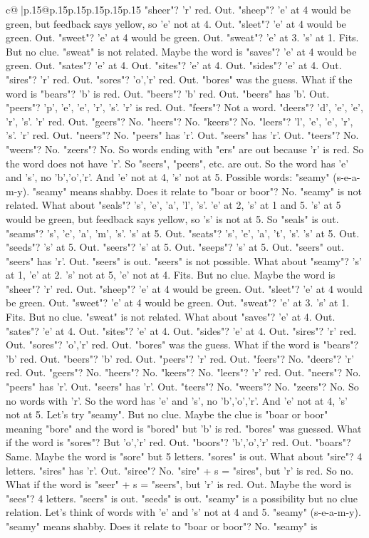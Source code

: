 \documentclass{article}
\begin{document}
{\begin{supertabular}{c@{$\;$}|p{.15\linewidth}@{}p{.15\linewidth}p{.15\linewidth}p{.15\linewidth}p{.15\linewidth}p{.15\linewidth}}
{{{"sheer"? 'r' red. Out. "sheep"? 'e' at 4 would be green, but feedback says yellow, so 'e' not at 4. Out. "sleet"? 'e' at 4 would be green. Out. "sweet"? 'e' at 4 would be green. Out. "sweat"? 'e' at 3. 's' at 1. Fits. But no clue. "sweat" is not related. Maybe the word is "saves"? 'e' at 4 would be green. Out. "sates"? 'e' at 4. Out. "sites"? 'e' at 4. Out. "sides"? 'e' at 4. Out. "sires"? 'r' red. Out. "sores"? 'o','r' red. Out. "bores" was the guess. What if the word is "bears"? 'b' is red. Out. "beers"? 'b' red. Out. "beers" has 'b'. Out. "peers"? 'p', 'e', 'e', 'r', 's'. 'r' is red. Out. "feers"? Not a word. "deers"? 'd', 'e', 'e', 'r', 's'. 'r' red. Out. "geers"? No. "heers"? No. "keers"? No. "leers"? 'l', 'e', 'e', 'r', 's'. 'r' red. Out. "neers"? No. "peers" has 'r'. Out. "seers" has 'r'. Out. "teers"? No. "weers"? No. "zeers"? No. So words ending with "ers" are out because 'r' is red. So the word does not have 'r'. So "seers", "peers", etc. are out. So the word has 'e' and 's', no 'b','o','r'. And 'e' not at 4, 's' not at 5. Possible words: "seamy" (s{-}e{-}a{-}m{-}y). "seamy" means shabby. Does it relate to "boar or boor"? No. "seamy" is not related. What about "seals"? 's', 'e', 'a', 'l', 's'. 'e' at 2, 's' at 1 and 5. 's' at 5 would be green, but feedback says yellow, so 's' is not at 5. So "seals" is out. "seams"? 's', 'e', 'a', 'm', 's'. 's' at 5. Out. "seats"? 's', 'e', 'a', 't', 's'. 's' at 5. Out. "seeds"? 's' at 5. Out. "seers"? 's' at 5. Out. "seeps"? 's' at 5. Out. "seers" out. "seers" has 'r'. Out. "seers" is out. "seers" is not possible. What about "seamy"? 's' at 1, 'e' at 2. 's' not at 5, 'e' not at 4. Fits. But no clue. Maybe the word is "sheer"? 'r' red. Out. "sheep"? 'e' at 4 would be green. Out. "sleet"? 'e' at 4 would be green. Out. "sweet"? 'e' at 4 would be green. Out. "sweat"? 'e' at 3. 's' at 1. Fits. But no clue. "sweat" is not related. What about "saves"? 'e' at 4. Out. "sates"? 'e' at 4. Out. "sites"? 'e' at 4. Out. "sides"? 'e' at 4. Out. "sires"? 'r' red. Out. "sores"? 'o','r' red. Out. "bores" was the guess. What if the word is "bears"? 'b' red. Out. "beers"? 'b' red. Out. "peers"? 'r' red. Out. "feers"? No. "deers"? 'r' red. Out. "geers"? No. "heers"? No. "keers"? No. "leers"? 'r' red. Out. "neers"? No. "peers" has 'r'. Out. "seers" has 'r'. Out. "teers"? No. "weers"? No. "zeers"? No. So no words with 'r'. So the word has 'e' and 's', no 'b','o','r'. And 'e' not at 4, 's' not at 5. Let's try "seamy". But no clue. Maybe the clue is "boar or boor" meaning "bore" and the word is "bored" but 'b' is red. "bores" was guessed. What if the word is "sores"? But 'o','r' red. Out. "boors"? 'b','o','r' red. Out. "boars"? Same. Maybe the word is "sore" but 5 letters. "sores" is out. What about "sire"? 4 letters. "sires" has 'r'. Out. "siree"? No. "sire" + s = "sires", but 'r' is red. So no. What if the word is "seer" + s = "seers", but 'r' is red. Out. Maybe the word is "sees"? 4 letters. "seers" is out. "seeds" is out. "seamy" is a possibility but no clue relation. Let's think of words with 'e' and 's' not at 4 and 5. "seamy" (s{-}e{-}a{-}m{-}y). "seamy" means shabby. Does it relate to "boar or boor"? No. "seamy" is }}}
\end{supertabular}}
\end{document}
